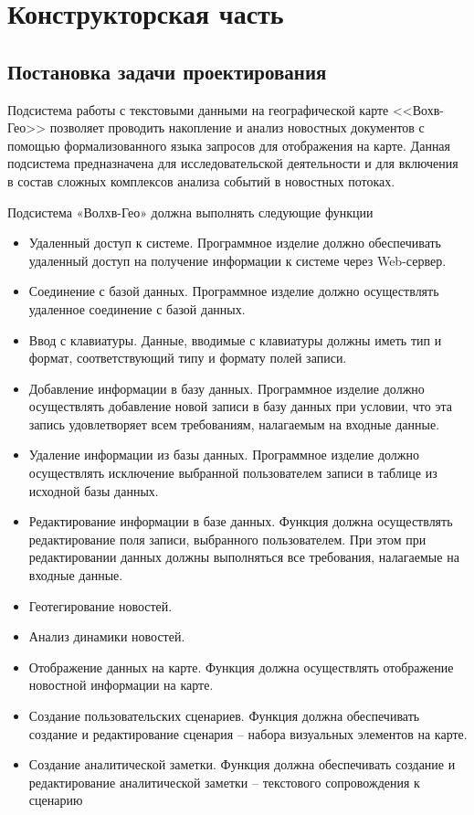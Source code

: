 \section{Конструкторская часть}

\subsection{Постановка задачи проектирования}

Подсистема работы с текстовыми данными на географической карте <<Вохв-Гео>> позволяет проводить накопление и анализ новостных документов с помощью формализованного языка запросов для отображения на карте. Данная подсистема предназначена для исследовательской деятельности и для включения в состав сложных комплексов анализа событий в новостных потоках.

Подсистема «Волхв-Гео» должна выполнять следующие функции
\begin{itemize}
\item Удаленный доступ к системе. Программное изделие должно обеспечивать удаленный доступ на получение информации к системе через Web-сервер.
\item Соединение с базой данных. Программное изделие должно осуществлять удаленное соединение с базой данных.
\item Ввод с клавиатуры. Данные, вводимые с клавиатуры должны иметь тип и формат, соответствующий типу и формату полей записи.
\item Добавление информации в базу данных. Программное изделие должно осуществлять добавление новой записи в базу данных при условии, что эта запись удовлетворяет всем требованиям, налагаемым на входные данные.
\item Удаление информации из базы данных. Программное изделие должно осуществлять исключение выбранной пользователем записи в таблице из исходной базы данных.
\item Редактирование информации в базе данных. Функция должна осуществлять редактирование поля записи, выбранного пользователем. При этом при редактировании данных должны выполняться все требования, налагаемые на входные данные.
\item Геотегирование новостей.
\item Анализ динамики новостей.
\item Отображение данных на карте. Функция должна осуществлять отображение новостной информации на карте.
\item Создание пользовательских сценариев. Функция должна обеспечивать создание и редактирование сценария – набора визуальных элементов на карте.
\item Создание аналитической заметки. Функция должна обеспечивать создание и редактирование аналитической заметки – текстового сопровождения к сценарию
\end{itemize}

